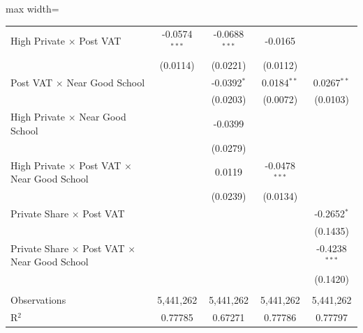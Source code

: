 \begin{table}[htbp]
\begin{adjustbox}{max width=\textwidth}
\begin{tabular}{lcccc}
      High Private $\times$ Post VAT                                      & -0.0574$^{***}$ & -0.0688$^{***}$ & -0.0165            &   \\
                                                                          & (0.0114)        & (0.0221)        & (0.0112)           &   \\
      Post VAT $\times$ Near Good School                                  &                 & -0.0392$^{*}$   & 0.0184$^{**}$      & 0.0267$^{**}$\\
                                                                          &                 & (0.0203)        & (0.0072)           & (0.0103)\\
      High Private $\times$ Near Good School                              &                 & -0.0399         &                    &   \\
                                                                          &                 & (0.0279)        &                    &   \\
      High Private $\times$ Post VAT $\times$ Near Good School            &                 & 0.0119          & -0.0478$^{***}$    &   \\
                                                                          &                 & (0.0239)        & (0.0134)           &   \\
      Private Share $\times$ Post VAT                                     &                 &                 &                    & -0.2652$^{*}$\\
                                                                          &                 &                 &                    & (0.1435)\\
      Private Share $\times$ Post VAT $\times$ Near Good School           &                 &                 &                    & -0.4238$^{***}$\\
                                                                          &                 &                 &                    & (0.1420)\\   
       \\
      Observations                                                        & 5,441,262       & 5,441,262       & 5,441,262          & 5,441,262\\  
      R$^2$                                                               & 0.77785         & 0.67271         & 0.77786            & 0.77797\\  

\end{tabular}
\end{adjustbox}
\end{table}
